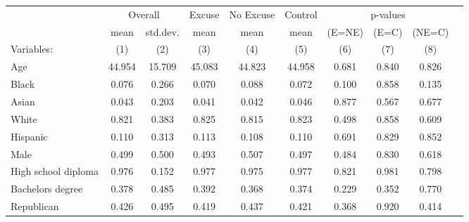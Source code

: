 \begin{table}[!ht]
\centering
\label{t:2-balance}
\vspace*{2mm}
\begin{threeparttable}
\begin{tabular}{lccccccccc}
\toprule
 & \multicolumn{2}{c}{Overall} & Excuse & No Excuse & Control & \multicolumn{3}{c}{p-values} \\
 \cmidrule(r){2-3} \cmidrule(lr){4-4} \cmidrule(lr){5-5} \cmidrule(lr){6-6} \cmidrule(lr){7-9} 
 & mean & std.dev. & mean & mean & mean & (E=NE) & (E=C) & (NE=C) \\
 \cmidrule(r){2-2} \cmidrule(lr){3-3} \cmidrule(lr){4-4} \cmidrule(lr){5-5} \cmidrule(l){6-6} \cmidrule(l){7-7} \cmidrule(l){8-8} \cmidrule(l){9-9}  
  Variables: & (1) & (2) & (3) & (4) & (5) & (6) & (7) & (8) \\ \midrule \midrule
Age & 44.954 & 15.709 & 45.083 & 44.823 & 44.958 & 0.681 & 0.840 & 0.826 \\
\addlinespace
Black & 0.076 & 0.266 & 0.070 & 0.088 & 0.072 & 0.100 & 0.858 & 0.135 \\
Asian & 0.043 & 0.203 & 0.041 & 0.042 & 0.046 & 0.877 & 0.567 & 0.677 \\
White & 0.821 & 0.383 & 0.825 & 0.815 & 0.823 & 0.498 & 0.858 & 0.609 \\
Hispanic & 0.110 & 0.313 & 0.113 & 0.108 & 0.110 & 0.691 & 0.829 & 0.852 \\
\addlinespace
Male & 0.499 & 0.500 & 0.493 & 0.507 & 0.497 & 0.484 & 0.830 & 0.618 \\
\addlinespace
High school diploma & 0.976 & 0.152 & 0.977 & 0.975 & 0.977 & 0.821 & 0.981 & 0.798 \\
Bachelors degree & 0.378 & 0.485 & 0.392 & 0.368 & 0.374 & 0.229 & 0.352 & 0.770 \\
\addlinespace
Republican & 0.426 & 0.495 & 0.419 & 0.437 & 0.421 & 0.368 & 0.920 & 0.414 \\
 \midrule
\bottomrule
\end{tabular}
\end{threeparttable} \end{table}
